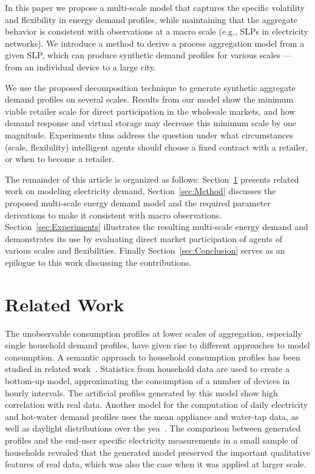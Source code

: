 \documentclass[conference]{IEEEtran}
\begin{document}
In this paper we propose a multi-scale model that captures the specific volatility and flexibility in energy demand profiles, while maintaining that the aggregate behavior is consistent with observations at a macro scale (e.g., SLPs in electricity networks). We introduce a method to derive a process aggregation model from a given SLP, which can produce synthetic demand profiles for various scales --- from an individual device to a large city. 

We use the proposed decomposition technique to generate synthetic aggregate demand profiles on several scales. Results from our model show the minimum viable retailer scale for direct participation in the wholesale markets, and how demand response and virtual storage may decrease this minimum scale by one magnitude. Experiments thus address the question under what circumstances (scale, flexibility) intelligent agents should choose a fixed contract with a retailer, or when to become a retailer.

The remainder of this article is organized as follows: Section~\ref{sec:Related} presents related work on modeling electricity demand, Section~\ref{sec:Method} discusses the proposed multi-scale energy demand model and the required parameter derivations to make it consistent with macro observations. Section~\ref{sec:Experiments} illustrates the resulting multi-scale energy demand and demonstrates its use by evaluating direct market participation of agents of various scales and flexibilities. Finally Section~\ref{sec:Conclusion} serves as an epilogue to this work discussing the contributions.


\section{Related Work}
\label{sec:Related}
The unobservable consumption profiles at lower scales of aggregation, especially single household demand profiles, have given rise to different approaches to model consumption. A semantic approach to household consumption profiles has been studied in related work~\cite{paatero2006model}. Statistics from household data are used to create a bottom-up model, approximating the consumption of a number of devices in hourly intervals. The artificial profiles generated by this model show high correlation with real data.
Another model for the computation of daily electricity and hot-water demand profiles uses the mean appliance and water-tap data, as well as daylight distributions over the yea~\cite{widen2009constructing}. The comparison between generated profiles and the end-user specific electricity measurements in a small sample of households revealed that the generated model preserved the important qualitative features of real data, which was also the case when it was applied at larger scale.
\end{document}
